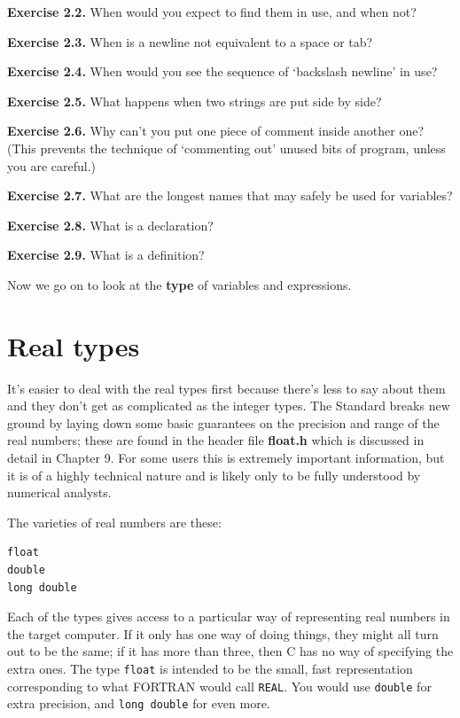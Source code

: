    \textbf{Exercise 2.2.} When would you expect to find them in use, and when
    not?


   \textbf{Exercise 2.3.} When is a newline not equivalent to a space or
    tab?


   \textbf{Exercise 2.4.} When would you see the sequence of `backslash
    newline' in use?


   \textbf{Exercise 2.5.} What happens when two strings are put side by
    side?


   \textbf{Exercise 2.6.} Why can't you put one piece of comment inside another
    one? (This prevents the technique of `commenting out' unused bits of
    program, unless you are careful.)


   \textbf{Exercise 2.7.} What are the longest names that may safely be used for
    variables?


   \textbf{Exercise 2.8.} What is a declaration?


   \textbf{Exercise 2.9.} What is a definition?


  

  Now we go on to look at the \textbf{type} of variables and
   expressions.


 
        \section{Real types}
        

  

  It's easier to deal with the real types first because there's less to say
   about them and they don't get as complicated as the integer types. The
   Standard breaks new ground by laying down some basic guarantees on the
   precision and range of the real numbers; these are found in the header file
   \textbf{float.h} which is discussed in detail in Chapter 9.
   For some users this is extremely important information, but it is of a
   highly technical nature and is likely only to be fully understood by
   numerical analysts.


  The varieties of real numbers are these:


  \begin{Verbatim}
float
double
long double
\end{Verbatim}

  Each of the types gives access to a particular way of representing real
   numbers in the target computer. If it only has one way of doing things,
   they might all turn out to be the same; if it has more than three, then C
   has no way of specifying the extra ones. The type \texttt{float} is
   intended to be the small, fast representation corresponding to what FORTRAN
   would call \texttt{REAL}. You would use \texttt{double} for extra
   precision, and \texttt{long double} for even more.


